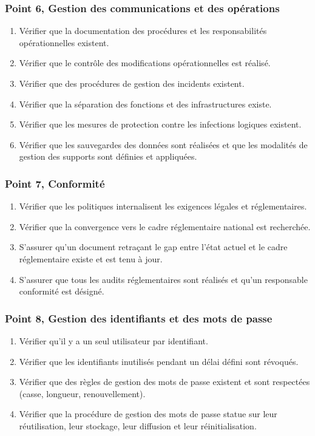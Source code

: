 \subsubsection{Point 6, Gestion des communications et des opérations}
\begin{enumerate}[label=6.\arabic*.]
    \item Vérifier que la documentation des procédures et les responsabilités opérationnelles existent.
    \item Vérifier que le contrôle des modifications opérationnelles est réalisé.
    \item Vérifier que des procédures de gestion des incidents existent.
    \item Vérifier que la séparation des fonctions et des infrastructures existe.
    \item Vérifier que les mesures de protection contre les infections logiques existent.
    \item Vérifier que les sauvegardes des données sont réalisées et que les modalités de gestion des supports sont définies et appliquées.
\end{enumerate}

\subsubsection{Point 7, Conformité}
\begin{enumerate}[label=7.\arabic*.]
    \item Vérifier que les politiques internalisent les exigences légales et réglementaires.
    \item Vérifier que la convergence vers le cadre réglementaire national est recherchée.
    \item S'assurer qu'un document retraçant le gap entre l'état actuel et le cadre réglementaire existe et est tenu à jour.
    \item S'assurer que tous les audits réglementaires sont réalisés et qu'un responsable conformité est désigné.
\end{enumerate}

\subsubsection{Point 8, Gestion des identifiants et des mots de passe}
\begin{enumerate}[label=8.\arabic*.]
    \item Vérifier qu'il y a un seul utilisateur par identifiant.
    \item Vérifier que les identifiants inutilisés pendant un délai défini sont révoqués.
    \item Vérifier que des règles de gestion des mots de passe existent et sont respectées (casse, longueur, renouvellement).
    \item Vérifier que la procédure de gestion des mots de passe statue sur leur réutilisation, leur stockage, leur diffusion et leur réinitialisation.
\end{enumerate}

